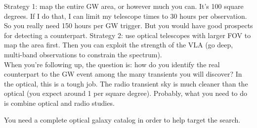 \documentclass[a4paper]{article}
\begin{document}
Strategy 1: map the entire GW area, or however much you can. It's 100 square degrees. If I do that, I can limit my telescope times to 30 hours per observation. So you really need 150 hours per GW trigger. But you would have good prospects for detecting a counterpart. Strategy 2: use optical telescopes with larger FOV to map the area first. Then you can exploit the strength of the VLA (go deep, multi-band observations to constrain the spectrum). \\

When you're following up, the question is: how do you identify the real counterpart to the GW event among the many transients you will discover? In the optical, this is a tough job. The radio transient sky is much cleaner than the optical (you expect around 1 per square degree). Probably, what you need to do is combine optical and radio studies.

You need a complete optical galaxy catalog in order to help target the search. 
\end{document}
